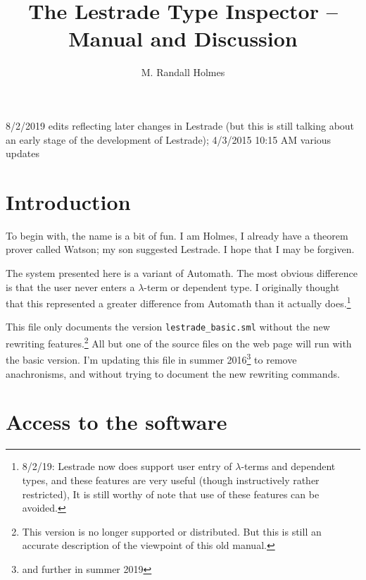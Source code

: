 
\title{The Lestrade Type Inspector -- Manual and Discussion}

\author{M. Randall Holmes}



\maketitle

  8/2/2019 edits reflecting later changes in Lestrade (but this is still talking about an early stage of the development of Lestrade); 4/3/2015 10:15 AM various updates

\tableofcontents

\section{Introduction}

To begin with, the name is a bit of fun.  I am Holmes, I already have a theorem prover called Watson; my son suggested Lestrade.  I hope that I may be forgiven.

The system presented here is a variant of Automath.  The most obvious difference is that the user never enters a $\lambda$-term or dependent type.  I originally thought that this represented a greater difference from Automath than it actually does.\footnote{8/2/19:  Lestrade now does support user entry of $\lambda$-terms and dependent types, and these features are very useful (though instructively rather restricted),  It is still worthy of note that use of these features can be avoided.}

This file only documents the version {\tt lestrade\_basic.sml} without the new rewriting features.\footnote{This version is no longer supported or distributed.  But this is still an accurate description of the viewpoint of this old manual.}  All but one of the source files on the web page will run with the basic version.  I'm updating this file in summer 2016\footnote{and further in summer 2019} to remove anachronisms, and without trying to document the new rewriting commands.

\section{Access to the software}

